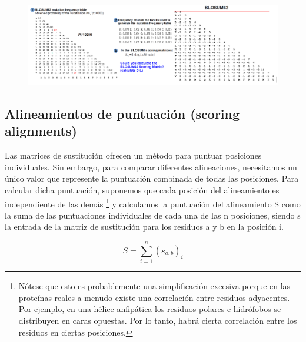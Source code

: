 \begin{figure}[htbp]
\centering
\includegraphics[width = \textwidth]{figs/ejercicio-blosum.png}
\end{figure}

\subsection{Alineamientos de puntuación (scoring alignments)}
Las matrices de sustitución ofrecen un método para puntuar posiciones individuales. Sin embargo, para comparar diferentes alineaciones, necesitamos un único valor que represente la puntuación combinada de todas las posiciones. Para calcular dicha puntuación, suponemos que cada posición del alineamiento es independiente de las demás \footnote{Nótese que esto es probablemente una simplificación excesiva porque en las proteínas reales a menudo existe una correlación entre residuos adyacentes. Por ejemplo, en una hélice anfipática los residuos polares e hidrófobos se distribuyen en caras opuestas. Por lo tanto, habrá cierta correlación entre los residuos en ciertas posiciones.} y calculamos la puntuación del alineamiento S como la suma de las puntuaciones individuales de cada una de las n posiciones, siendo s la entrada de la matriz de sustitución para los residuos a y b en la posición i.

$$S = \sum_{i = 1}^{n} (s_{a,b})_i$$

